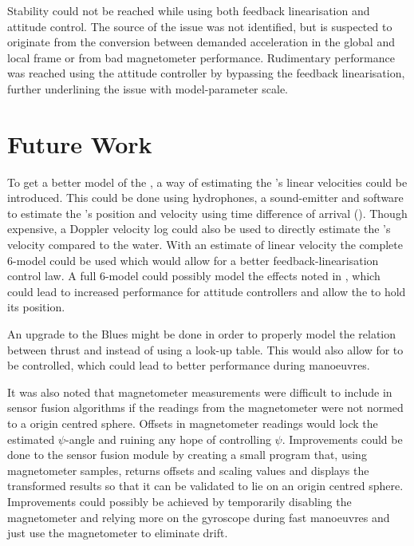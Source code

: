 Stability could not be reached while using both feedback linearisation and attitude control. The source of the issue was not identified, but is suspected to originate from the conversion between demanded acceleration in the global and local frame or from bad magnetometer performance. Rudimentary performance was reached using the attitude controller by bypassing the feedback linearisation, further underlining the issue with model-parameter scale.
\section{Future Work}
To get a better model of the \abbrROV, a way of estimating the \abbrROV's linear velocities could be introduced. This could be done using hydrophones, a sound-emitter and software to estimate the \abbrROV's position and velocity using time difference of arrival (\abbrTDOA). Though expensive, a Doppler velocity log could also be used to directly estimate the \abbrROV's velocity compared to the water.
With an estimate of linear velocity the complete 6-\abbrDOF model could be used which would allow for a better feedback-linearisation control law. A full 6-\abbrDOF model could possibly model the effects noted in , which could lead to increased performance for attitude controllers and allow the \abbrROV to hold its position.

An upgrade to the Blue\abbrESC{}s might be done in order to properly model the relation between thrust and \abbrRPM instead of using a look-up table. This would also allow for \abbrRPM to be controlled, which could lead to better performance during manoeuvres. 

It was also noted that magnetometer measurements were difficult to include in sensor fusion algorithms if the readings from the magnetometer were not normed to a origin centred sphere. Offsets in magnetometer readings would lock the estimated $\psi$-angle and ruining any hope of controlling $\psi$. Improvements could be done to the sensor fusion module by creating a small program that, using magnetometer samples, returns offsets and scaling values and displays the transformed results so that it can be validated to lie on an origin centred sphere.
Improvements could possibly be achieved by temporarily disabling the magnetometer and relying more on the gyroscope during fast manoeuvres and just use the magnetometer to eliminate drift. 